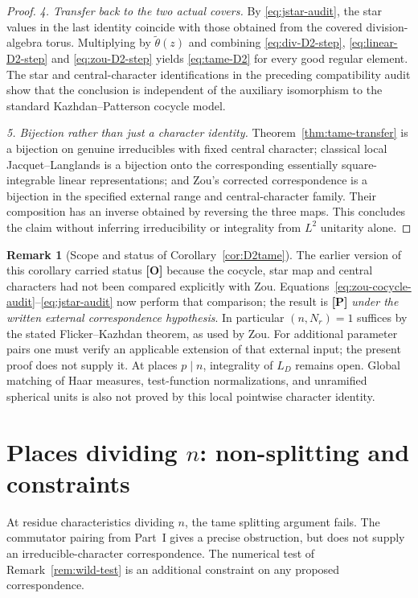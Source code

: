 \documentclass[11pt]{article}
\theoremstyle{plain}
\theoremstyle{definition}
\newtheorem{remark}[theorem]{Remark}
\begin{document}
\begin{proof}
\emph{4. Transfer back to the two actual covers.}
By \eqref{eq:jstar-audit}, the star values in the last
identity coincide with those obtained from the covered
division-algebra torus.  Multiplying by
$\widetilde\theta(z)$ and combining
\eqref{eq:div-D2-step}, \eqref{eq:linear-D2-step}
and \eqref{eq:zou-D2-step} yields
\eqref{eq:tame-D2} for every good regular element.
The star and central-character identifications in the
preceding compatibility audit show that the conclusion is
independent of the auxiliary isomorphism to the standard
Kazhdan--Patterson cocycle model.

\emph{5. Bijection rather than just a character identity.}
Theorem~\ref{thm:tame-transfer} is a bijection on genuine
irreducibles with fixed central character; classical local
Jacquet--Langlands is a bijection onto the corresponding
essentially square-integrable linear representations; and
Zou's corrected correspondence is a bijection in the
specified external range and central-character family.
Their composition has an inverse obtained by reversing the
three maps.  This concludes the claim without inferring
irreducibility or integrality from $L^2$ unitarity alone.
\end{proof}
\begin{remark}[Scope and status of Corollary~\ref{cor:D2tame}]
The earlier version of this corollary carried status
\textbf{[O]} because the cocycle, star map and central
characters had not been compared explicitly with Zou.
Equations~\eqref{eq:zou-cocycle-audit}--\eqref{eq:jstar-audit}
now perform that comparison; the result is \textbf{[P]}
\emph{under the written external correspondence hypothesis}.
In particular $(n,N_r)=1$ suffices by the stated
Flicker--Kazhdan theorem, as used by Zou.  For additional
parameter pairs one must verify an applicable extension of
that external input; the present proof does not supply it.
At places $p\mid n$, integrality of $L_D$ remains open.
Global matching of Haar measures, test-function normalizations,
and unramified spherical units is also not proved by this
local pointwise character identity.
\end{remark}

\section{Places dividing \texorpdfstring{$n$}{n}: non-splitting and constraints}\label{sec:wild}
At residue characteristics dividing $n$, the tame splitting
argument fails. The commutator pairing from Part~I gives a precise
obstruction, but does not supply an irreducible-character
correspondence. The numerical test of Remark~\ref{rem:wild-test}
is an additional constraint on any proposed correspondence.
\end{document}

